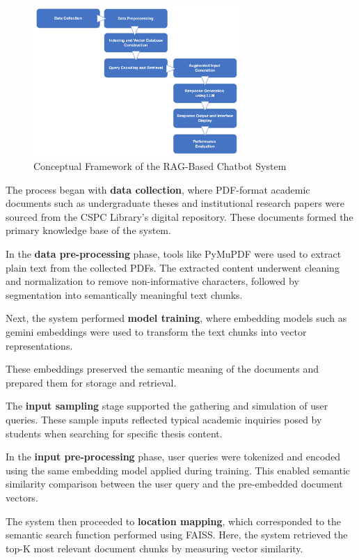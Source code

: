 \begin{refsection}
\begin{figure}[H]
    \centering
    \includegraphics[width=0.7\textwidth]{figures/framework.png}
    \caption{Conceptual Framework of the RAG-Based Chatbot System}
    \label{fig:conceptual_framework}
\end{figure}

The process began with \textbf{data collection}, where PDF-format academic documents such as undergraduate theses and institutional research papers were sourced from the CSPC Library’s digital repository. These documents formed the primary knowledge base of the system.

In the \textbf{data pre-processing} phase, tools like PyMuPDF were used to extract plain text from the collected PDFs. The extracted content underwent cleaning and normalization to remove non-informative characters, followed by segmentation into semantically meaningful text chunks.

Next, the system performed \textbf{model training}, where embedding models such as gemini embeddings were used to transform the text chunks into vector representations.


These embeddings preserved the semantic meaning of the documents and prepared them for storage and retrieval.

The \textbf{input sampling} stage supported the gathering and simulation of user queries. These sample inputs reflected typical academic inquiries posed by students when searching for specific thesis content.

In the \textbf{input pre-processing} phase, user queries were tokenized and encoded using the same embedding model applied during training. This enabled semantic similarity comparison between the user query and the pre-embedded document vectors.

The system then proceeded to \textbf{location mapping}, which corresponded to the semantic search function performed using FAISS. Here, the system retrieved the top-K most relevant document chunks by measuring vector similarity.


\end{refsection}
